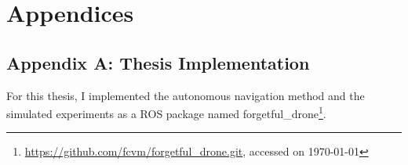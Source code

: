 \chapter*{Appendices}
\label{appendices}

{}
\section*{Appendix A: Thesis Implementation}


For this thesis, I implemented the autonomous navigation method 
and the simulated experiments as a ROS package named forgetful\_drone\footnote{
    \url{https://github.com/fcvm/forgetful_drone.git}, accessed on \today
}.




